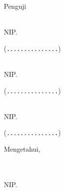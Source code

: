 {\begin{center}
		\vspace{0.75em}

		Penguji

		\vspace{0.75em}

		\begin{minipage}{0.875\linewidth}
			\begin{minipage}{0.6\linewidth}
				\examinerOne \\
				NIP. \examinerOneId
			\end{minipage}
			\hfill
			\begin{minipage}{0.275\linewidth}
				\begin{flushright}
					(\texttt{...............})
				\end{flushright}
			\end{minipage}
		\end{minipage}

		\vspace{0.75em}

		\begin{minipage}{0.875\linewidth}
			\begin{minipage}{0.6\linewidth}
				\examinerTwo \\
				NIP. \examinerTwoId
			\end{minipage}
			\hfill
			\begin{minipage}{0.275\linewidth}
				\begin{flushright}
					(\texttt{...............})
				\end{flushright}
			\end{minipage}
		\end{minipage}

		\vspace{0.75em}

		\begin{minipage}{0.875\linewidth}
			\begin{minipage}{0.6\linewidth}
				\examinerThree \\
				NIP. \examinerThreeId
			\end{minipage}
			\hfill
			\begin{minipage}{0.275\linewidth}
				\begin{flushright}
					(\texttt{...............})
				\end{flushright}
			\end{minipage}
		\end{minipage}
	\end{center}

	\vspace{1.25em}

	\hfill
	\begin{minipage}{0.6\linewidth}
		\centering
		Mengetahui, \\
		\departmentHeadTitle \\
		\facultyNameBahasa

		\vspace{4em}

		\uline{\departmentHead} \\
		NIP. \departmentHeadId
	\end{minipage}
}
